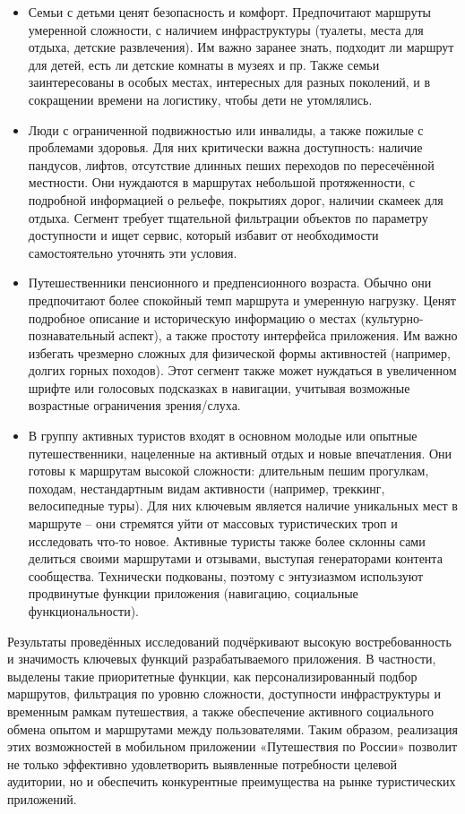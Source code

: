 \begin{itemize}
    \item 	Семьи с детьми ценят безопасность и комфорт. Предпочитают маршруты умеренной сложности, с наличием инфраструктуры (туалеты, места для отдыха, детские развлечения). Им важно заранее знать, подходит ли маршрут для детей, есть ли детские комнаты в музеях и пр. Также семьи заинтересованы в особых местах, интересных для разных поколений, и в сокращении времени на логистику, чтобы дети не утомлялись.
    \item 	Люди с ограниченной подвижностью или инвалиды, а также пожилые с проблемами здоровья. Для них критически важна доступность: наличие пандусов, лифтов, отсутствие длинных пеших переходов по пересечённой местности. Они нуждаются в маршрутах небольшой протяженности, с подробной информацией о рельефе, покрытиях дорог, наличии скамеек для отдыха. Сегмент требует тщательной фильтрации объектов по параметру доступности и ищет сервис, который избавит от необходимости самостоятельно уточнять эти условия.
    \item 	Путешественники пенсионного и предпенсионного возраста. Обычно они предпочитают более спокойный темп маршрута и умеренную нагрузку. Ценят подробное описание и историческую информацию о местах (культурно-познавательный аспект), а также простоту интерфейса приложения. Им важно избегать чрезмерно сложных для физической формы активностей (например, долгих горных походов). Этот сегмент также может нуждаться в увеличенном шрифте или голосовых подсказках в навигации, учитывая возможные возрастные ограничения зрения/слуха.
    \item 	В группу активных туристов входят в основном молодые или опытные путешественники, нацеленные на активный отдых и новые впечатления. Они готовы к маршрутам высокой сложности: длительным пешим прогулкам, походам, нестандартным видам активности (например, треккинг, велосипедные туры). Для них ключевым является наличие уникальных мест в маршруте – они стремятся уйти от массовых туристических троп и исследовать что-то новое. Активные туристы также более склонны сами делиться своими маршрутами и отзывами, выступая генераторами контента сообщества. Технически подкованы, поэтому с энтузиазмом используют продвинутые функции приложения (навигацию, социальные функциональности).
\end{itemize}

\noindent Результаты проведённых исследований подчёркивают высокую востребованность и значимость ключевых функций разрабатываемого приложения. В частности, выделены такие приоритетные функции, как персонализированный подбор маршрутов, фильтрация по уровню сложности, доступности инфраструктуры и временным рамкам путешествия, а также обеспечение активного социального обмена опытом и маршрутами между пользователями. Таким образом, реализация этих возможностей в мобильном приложении «Путешествия по России» позволит не только эффективно удовлетворить выявленные потребности целевой аудитории, но и обеспечить конкурентные преимущества на рынке туристических приложений.


